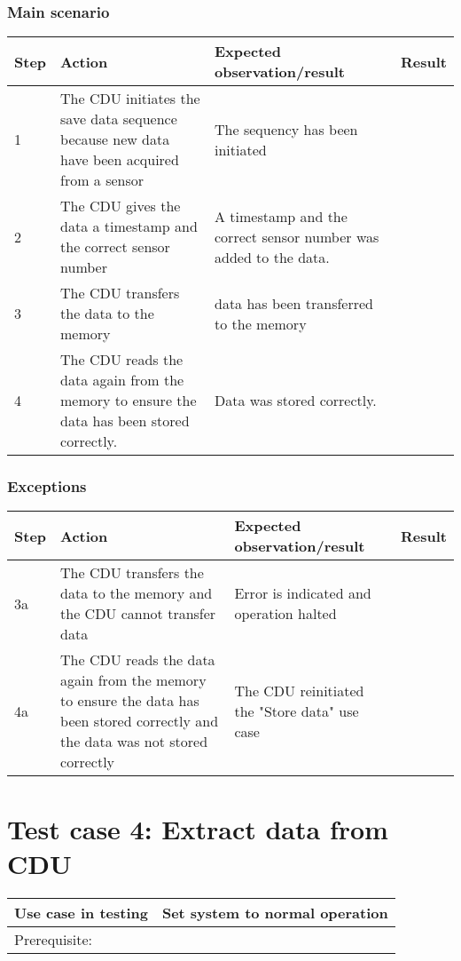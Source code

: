 \subsubsection{Main scenario}
\begin{table}[H]
    \begin{tabular}{|l|p{7cm}|p{5cm}|l|}
    \hline
    Step & Action & Expected observation/result & Result \\ \hline
    1 & The CDU initiates the save data sequence because new data have been acquired from a sensor & The sequency has been initiated & ~ \\ \hline
    2 & The CDU gives the data a timestamp and the correct sensor number & A timestamp and the correct sensor number was added to the data. & ~ \\ \hline
    3 & The CDU transfers the data to the memory & data has been transferred to the memory & ~ \\ \hline
    4 & The CDU reads the data again from the memory to ensure the data has been stored correctly. & Data was stored correctly. & ~ \\ \hline
    \end{tabular}
\end{table}

\subsubsection{Exceptions}
\begin{table}[H]
    \begin{tabular}{|l|p{7cm}|p{5cm}|l|}
    \hline
    Step & Action & Expected observation/result & Result \\ \hline
    3a & The CDU transfers the data to the memory and the CDU cannot transfer data & Error is indicated and operation halted & ~ \\ \hline
    4a & The CDU reads the data again from the memory to ensure the data has been stored correctly and the data was not stored correctly & The CDU reinitiated the "Store data" use case & ~ \\ \hline
    \end{tabular}
\end{table}

\section{Test case 4: Extract data from CDU}
\begin{table}[H]
    \begin{tabular}{|l|p{7cm}|}
    \hline
    Use case in testing & Set system to normal operation \\ \hline
    Prerequisite: & ~ \\ \hline
    \end{tabular}
\end{table}

